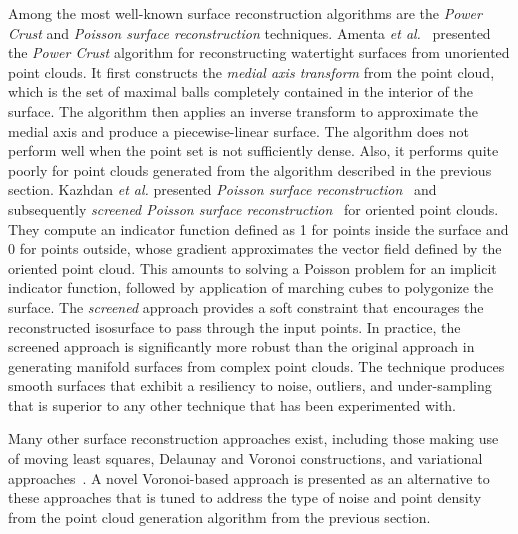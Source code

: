 Among the most well-known surface reconstruction algorithms are the \textit{Power Crust} and \textit{Poisson surface reconstruction} techniques. Amenta \textit{et al.}~\cite{amenta_2001} presented the \textit{Power Crust} algorithm for reconstructing watertight surfaces from unoriented point clouds. It first constructs the \textit{medial axis transform} from the point cloud, which is the set of maximal balls completely contained in the interior of the surface. The algorithm then applies an inverse transform to approximate the medial axis and produce a piecewise-linear surface. The algorithm does not perform well when the point set is not sufficiently dense. Also, it performs quite poorly for point clouds generated from the algorithm described in the previous section. Kazhdan \textit{et al.} presented \textit{Poisson surface reconstruction}~\cite{kazhdan_2008} and subsequently \textit{screened Poisson surface reconstruction}~\cite{kazhdan_2013} for oriented point clouds. They compute an indicator function defined as 1 for points inside the surface and 0 for points outside, whose gradient approximates the vector field defined by the oriented point cloud. This amounts to solving a Poisson problem for an implicit indicator function, followed by application of marching cubes to polygonize the surface. The \textit{screened} approach provides a soft constraint that encourages the reconstructed isosurface to pass through the input points. In practice, the screened approach is significantly more robust than the original approach in generating manifold surfaces from complex point clouds. The technique produces smooth surfaces that exhibit a resiliency to noise, outliers, and under-sampling that is superior to any other technique that has been experimented with.

Many other surface reconstruction approaches exist, including those making use of moving least squares, Delaunay and Voronoi constructions, and variational approaches~\cite{berger}. A novel Voronoi-based approach is presented as an alternative to these approaches that is tuned to address the type of noise and point density from the point cloud generation algorithm from the previous section.

